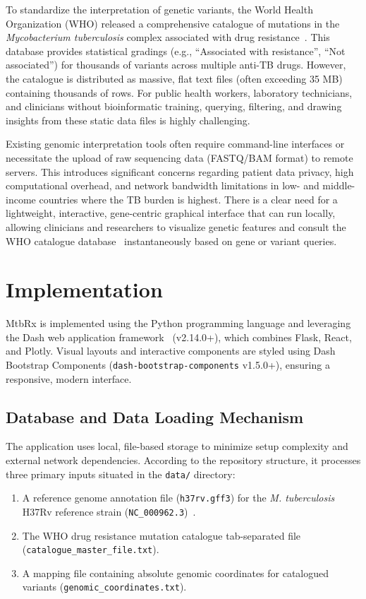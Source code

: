 \documentclass{article}
\begin{document}
To standardize the interpretation of genetic variants, the World Health Organization (WHO) released a comprehensive catalogue of mutations in the \textit{Mycobacterium tuberculosis} complex associated with drug resistance~\cite{whocatalogue}. This database provides statistical gradings (e.g., ``Associated with resistance'', ``Not associated'') for thousands of variants across multiple anti-TB drugs. However, the catalogue is distributed as massive, flat text files (often exceeding 35 MB) containing thousands of rows. For public health workers, laboratory technicians, and clinicians without bioinformatic training, querying, filtering, and drawing insights from these static data files is highly challenging.

Existing genomic interpretation tools often require command-line interfaces or necessitate the upload of raw sequencing data (FASTQ/BAM format) to remote servers. This introduces significant concerns regarding patient data privacy, high computational overhead, and network bandwidth limitations in low- and middle-income countries where the TB burden is highest. There is a clear need for a lightweight, interactive, gene-centric graphical interface that can run locally, allowing clinicians and researchers to visualize genetic features and consult the WHO catalogue database~\cite{whocatalogue} instantaneously based on gene or variant queries.

\section{Implementation}
MtbRx is implemented using the Python programming language and leveraging the Dash web application framework~\cite{plotlydash} (v2.14.0+), which combines Flask, React, and Plotly. Visual layouts and interactive components are styled using Dash Bootstrap Components (\texttt{dash-bootstrap-components} v1.5.0+), ensuring a responsive, modern interface.

\subsection{Database and Data Loading Mechanism}
The application uses local, file-based storage to minimize setup complexity and external network dependencies. According to the repository structure, it processes three primary inputs situated in the \texttt{data/} directory:
\begin{enumerate}
    \item A reference genome annotation file (\texttt{h37rv.gff3}) for the \textit{M. tuberculosis} H37Rv reference strain (\texttt{NC\_000962.3})~\cite{refseq}.
    \item The WHO drug resistance mutation catalogue tab-separated file (\texttt{catalogue\_master\_file.txt}).
    \item A mapping file containing absolute genomic coordinates for catalogued variants (\texttt{genomic\_coordinates.txt}).
\end{enumerate}
\end{document}
